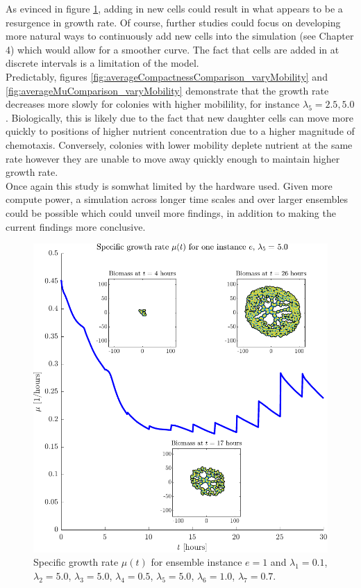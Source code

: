 As evinced in figure \ref{fig:MuSingleInstance5.0}, adding in new cells 
could result in what appears to be a resurgence in growth rate. Of course,
further studies could focus on developing more natural ways to continuously add new cells into the 
simulation (see Chapter 4) which would allow for a smoother curve.
The fact that cells are added in at discrete intervals is a limitation of the model.
\\

Predictably, figures \ref{fig:averageCompactnessComparison_varyMobility} 
and \ref{fig:averageMuComparison_varyMobility} demonstrate 
that the growth rate decreases more slowly for colonies with higher 
mobilility, for instance $\lambda_5 = 2.5, 5.0$. Biologically,
this is likely due to the fact that new daughter cells can move more
quickly to positions of higher nutrient concentration due to a 
higher magnitude of chemotaxis. Conversely, colonies with lower mobility
deplete nutrient at the same rate however they are 
unable to move away quickly enough to maintain higher growth rate.
\\

Once again this study is somwhat limited by the hardware used. 
Given more compute power, a simulation across longer time scales and 
over larger ensembles could be 
possible which could unveil more findings, in addition to 
making the current findings more conclusive.


\begin{figure}[!htb]
    \centering
    \includegraphics[width= \textwidth]{
        chapter3/figures/Inset_L1_0o10_L2_5o00_L3_5o00_L4_0o50_L5_5o00_L6_1o00_L7_0o70.pdf}
    \caption{Specific growth rate $\mu(t)$ for ensemble instance $e = 1$ and 
             $\lambda_1 = 0.1$,  
             $\lambda_2 = 5.0$, 
             $\lambda_3 = 5.0$, 
             $\lambda_4 = 0.5$, 
             $\lambda_5 = 5.0$, 
             $\lambda_6 = 1.0$, 
             $\lambda_7 = 0.7$.}
    \label{fig:MuSingleInstance5.0}
\end{figure}

